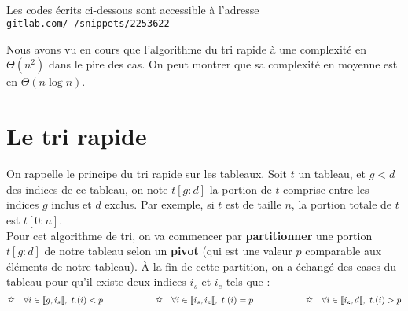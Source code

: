 \documentclass[a4paper,french,bookmarks]{article}
\begin{document}

\hfill\\[-35pt]
\begin{center}
    \begin{minipage}{0.8\linewidth}
        \begin{tcolorbox}[
            breakable,
            enhanced,
            interior style      = {left color=main4!15,right color=main2!12},
            borderline north    = {.5pt}{0pt}{main2!10},
            borderline south    = {.5pt}{0pt}{main2!10},
            borderline west     = {.5pt}{0pt}{main2!10},
            borderline east     = {.5pt}{0pt}{main2!10},
            sharp corners       = downhill,
            arc                 = 0 cm,
            boxrule             = 0.5pt,
            drop fuzzy shadow   = black!40!white,
            nobeforeafter,
        ]
        \centering  Les codes écrits ci-dessous sont accessible à l'adresse \texttt{\href{https://gitlab.com/-/snippets/2253622}{gitlab.com/-/snippets/2253622}}
    \end{tcolorbox}
\end{minipage}
\end{center}

Nous avons vu en cours que l’algorithme du tri rapide à une complexité en $\Theta(n^2)$ dans le pire des cas. On peut montrer que sa complexité en moyenne est en $\Theta(n \log n)$.\\[-20pt]

\section{Le tri rapide}%

On rappelle le principe du tri rapide sur les tableaux. Soit $t$ un tableau, et $g < d$ des indices de ce tableau, on note $t[g :d]$ la portion de $t$ comprise entre les indices $g$ inclus et $d$ exclus. Par exemple, si $t$ est de taille $n$, la portion totale de $t$ est $t[0 : n]$.\\[-10pt]

Pour cet algorithme de tri, on va commencer par \textbf{partitionner} une portion $t[g : d]$ de notre tableau selon un \textbf{pivot} (qui est une valeur $p$ comparable aux éléments de notre tableau). À la fin de cette partition, on a échangé des cases du tableau pour qu’il existe deux indices $i_s$ et $i_e$ tels que :
\[\text{\ding{73}}\quad \forall i \in \llbracket g , i_s\llbracket, \ t.(i) < p \qquad\qquad\qquad\text{\ding{73}}\quad \forall i \in \llbracket i_s, i_e\llbracket, \ t.(i) = p \qquad\qquad\qquad\text{\ding{73}}\quad \forall i \in \llbracket i_e, d \llbracket, \ t.(i) > p\]
\end{document}
